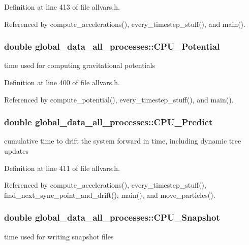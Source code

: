 Definition at line 413 of file allvars.h.



Referenced by compute\_\-accelerations(), every\_\-timestep\_\-stuff(), and main().

\hypertarget{structglobal__data__all__processes_ab5f1e056cdaa2562ec2bd3945f634d73}{
\subsubsection[{CPU\_\-Potential}]{\setlength{\rightskip}{0pt plus 5cm}double {\bf global\_\-data\_\-all\_\-processes::CPU\_\-Potential}}}
\label{structglobal__data__all__processes_ab5f1e056cdaa2562ec2bd3945f634d73}
time used for computing gravitational potentials 

Definition at line 400 of file allvars.h.



Referenced by compute\_\-potential(), every\_\-timestep\_\-stuff(), and main().

\hypertarget{structglobal__data__all__processes_afb9d30620ea0dc8b9e46000e3ce0b3e3}{
\subsubsection[{CPU\_\-Predict}]{\setlength{\rightskip}{0pt plus 5cm}double {\bf global\_\-data\_\-all\_\-processes::CPU\_\-Predict}}}
\label{structglobal__data__all__processes_afb9d30620ea0dc8b9e46000e3ce0b3e3}
cumulative time to drift the system forward in time, including dynamic tree updates 

Definition at line 411 of file allvars.h.



Referenced by compute\_\-accelerations(), every\_\-timestep\_\-stuff(), find\_\-next\_\-sync\_\-point\_\-and\_\-drift(), main(), and move\_\-particles().

\hypertarget{structglobal__data__all__processes_a4b533ec2fc1af7ee057eaa5805a65a7a}{
\subsubsection[{CPU\_\-Snapshot}]{\setlength{\rightskip}{0pt plus 5cm}double {\bf global\_\-data\_\-all\_\-processes::CPU\_\-Snapshot}}}
\label{structglobal__data__all__processes_a4b533ec2fc1af7ee057eaa5805a65a7a}
time used for writing snapshot files 


